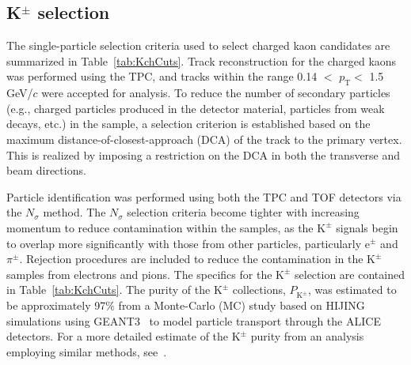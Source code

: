 \documentclass[ALICE,manyauthors]{cernphprep}
\newcommand{\pt}{$p_{\mathrm{T}}$\xspace}
\newcommand{\Kpm}{$\mathrm{K^{\pm}}$\xspace}
\begin{document}
\subsection{K$^{\pm}$ selection}
\label{sec:KchSelection}
The single-particle selection criteria used to select charged kaon candidates are summarized in Table~\ref{tab:KchCuts}.
Track reconstruction for the charged kaons was performed using the TPC, and tracks within the range 0.14 $<$ \pt $<$ 1.5 GeV/$c$ were accepted for analysis.
To reduce the number of secondary particles (e.g., charged particles produced in the detector material, particles from weak decays, etc.) in the sample, a selection criterion is established based on the maximum distance-of-closest-approach (DCA) of the track to the primary vertex.
This is realized by imposing a restriction on the DCA in both the transverse and beam directions.

Particle identification was performed using both the TPC and TOF detectors via the $N_{\sigma}$ method. 
The $N_{\sigma}$ selection criteria become tighter with increasing momentum to reduce contamination within the samples, as the \Kpm signals begin to overlap more significantly with those from other particles, particularly e$^{\pm}$ and $\pi^{\pm}$.
Rejection procedures are included to reduce the contamination in the \Kpm samples from electrons and pions.  
The specifics for the \Kpm selection are contained in Table~\ref{tab:KchCuts}.
The purity of the \Kpm collections, $P_{\mathrm{K}^{\pm}}$, was estimated to be approximately 97\% from a Monte-Carlo (MC) study based on HIJING~\cite{PhysRevD.44.3501} simulations using GEANT3~\cite{Brun:1082634} to model particle transport through the ALICE detectors. 
For a more detailed estimate of the \Kpm purity from an analysis employing similar methods, see~\cite{Acharya:2017qtq}.
\end{document}
